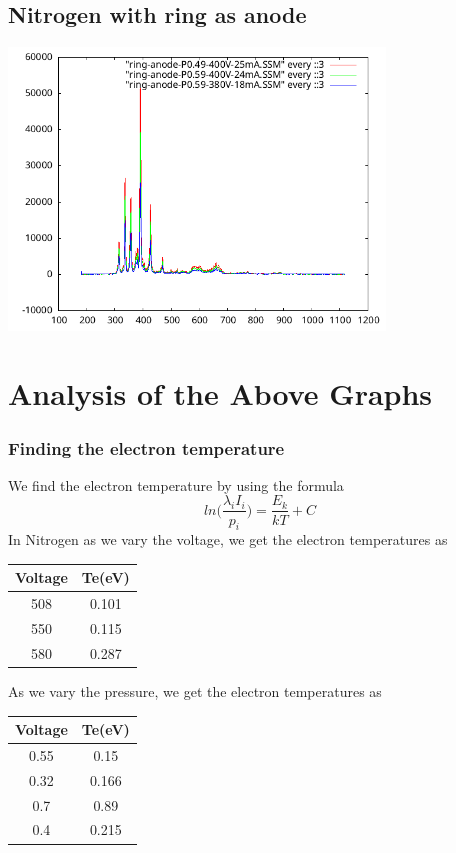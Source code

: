 \documentclass[]{report}[12 pt]
\begin{document}
\subsection{Nitrogen with ring as anode }
\begin{center}
	\includegraphics[width=10cm]{nitrogen_ring_anode.png}
\end{center}

\section{Analysis of the Above Graphs}
\subsubsection{Finding the electron temperature}
We find the electron temperature by using the formula
\[ln\bigg(\frac{\lambda_iI_i}{p_i}\bigg)=\frac{E_k}{kT}+C\]
In Nitrogen as we vary the voltage, we get the electron temperatures as \\
\begin{center}
	\begin{tabular}{|c|c|}
		\hline
		Voltage &  Te(eV) \\
		\hline
		508 & 0.101 \\
		\hline
		550 & 0.115 \\
		\hline
		580 & 0.287 \\
		\hline
	\end{tabular}
\end{center}
As we vary the pressure, we get the electron temperatures as 
\begin{center}
	\begin{tabular}{|c|c|}
		\hline
		Voltage &  Te(eV) \\
		\hline
		0.55 & 0.15 \\
		\hline
		0.32 & 0.166 \\
		\hline
		0.7 & 0.89 \\
		\hline
		0.4&0.215\\
		\hline
	\end{tabular}
\end{center}
\end{document}
